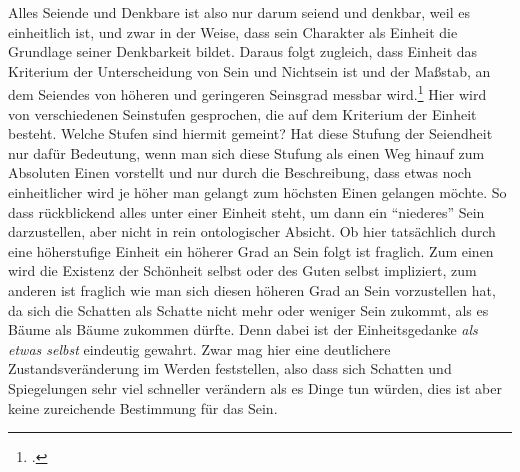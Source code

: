 
Alles Seiende und Denkbare ist also nur darum seiend und denkbar, weil es einheitlich ist, und zwar in der Weise, dass sein Charakter als Einheit die Grundlage seiner Denkbarkeit bildet. Daraus folgt zugleich, dass Einheit das Kriterium der Unterscheidung von Sein und Nichtsein ist und der Maßstab, an dem Seiendes von höheren und geringeren Seinsgrad messbar wird.\footcite[vgl.][S. 99]{halfwassen2015spuren}
Hier wird von verschiedenen Seinstufen gesprochen, die auf dem Kriterium der Einheit besteht. Welche Stufen sind hiermit gemeint?
Hat diese Stufung der Seiendheit nur dafür Bedeutung, wenn man sich diese Stufung als einen Weg hinauf zum Absoluten Einen vorstellt und nur durch die Beschreibung, dass etwas noch einheitlicher wird je höher man gelangt zum höchsten Einen gelangen möchte. So dass rückblickend alles unter einer Einheit steht, um dann ein \enquote{niederes} Sein darzustellen, aber nicht in rein ontologischer Absicht.
Ob hier tatsächlich durch eine höherstufige Einheit ein höherer Grad an Sein folgt ist fraglich. Zum einen wird die Existenz der Schönheit selbst oder des Guten selbst impliziert, zum anderen ist fraglich wie man sich diesen höheren Grad an Sein vorzustellen hat, da sich die Schatten als Schatte nicht mehr oder weniger Sein zukommt, als es Bäume als Bäume zukommen dürfte. Denn dabei ist der Einheitsgedanke \emph{als etwas selbst} eindeutig gewahrt. Zwar mag hier eine deutlichere Zustandsveränderung im Werden feststellen, also dass sich Schatten und Spiegelungen sehr viel schneller verändern als es Dinge tun würden, dies ist aber keine zureichende Bestimmung für das Sein. 
